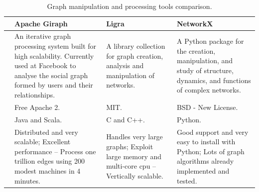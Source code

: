 \begin{table}[H]
    \caption{Graph manipulation and processing tools comparison.}
    \label{table:graph_manipulation_and_processing_tools_comparison}
    \centering
    \begin{tabularx}{\linewidth} {
            >{\hsize=0.3\hsize}X|
            >{\hsize=1.0\hsize}X|
            >{\hsize=1.0\hsize}X|
            >{\hsize=1.0\hsize}X|}
        \cline{2-4}

         & Apache Giraph \cite{apache_giraph}
         & Ligra \cite{ligra_graph_processing_framework}
         & NetworkX \cite{networkx}                                                                                                                                                       \\ \hline \hline
        \multicolumn{1}{|l|}{\textbf{Description}}
         & An iterative graph processing system built for high scalability. Currently used at Facebook to analyse the social graph formed by users and their relationships.
         & A library collection for graph creation, analysis and manipulation of networks.
         & A Python package for the creation, manipulation, and study of structure, dynamics, and functions of complex networks.                                                          \\ \hline
        \multicolumn{1}{|l|}{\textbf{Licence}~\cite{Morin2012}}
         & Free Apache 2.
         & MIT.
         & BSD - New License.                                                                                                                                                             \\ \hline
        \multicolumn{1}{|p{2.2cm}|}{\textbf{Supported languages}}
         & Java and Scala.
         & C and C++.
         & Python.                                                                                                                                                                        \\ \hline
        \multicolumn{1}{|l|}{\textbf{Pros}}
         & Distributed and very scalable; \newline
        Excellent performance -- Process one trillion edges using 200 modest machines in 4 minutes.
         & Handles very large graphs; \newline
        Exploit large memory and multi-core \gls{cpu} -- Vertically scalable.
         & Good support and very easy to install with Python; \newline
        Lots of graph algorithms already implemented and tested. \newline                                                                                                                 \\ \hline

\end{tabularx}
\end{table}
